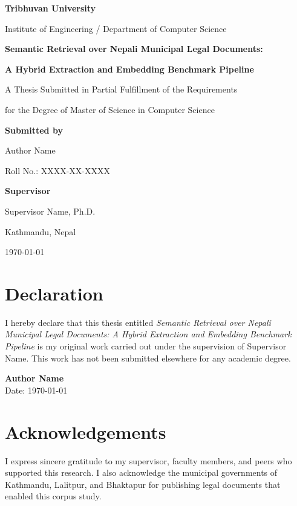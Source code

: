 \begin{titlepage}
  \centering
  \vspace*{1.5cm}
  {\LARGE\bfseries Tribhuvan University\par}
  \vspace{0.4cm}
  {\large Institute of Engineering / Department of Computer Science\par}
  \vspace{2cm}
  {\huge\bfseries Semantic Retrieval over Nepali Municipal Legal Documents:\par}
  \vspace{0.5cm}
  {\LARGE\bfseries A Hybrid Extraction and Embedding Benchmark Pipeline\par}
  \vspace{2cm}
  {\Large A Thesis Submitted in Partial Fulfillment of the Requirements\par}
  {\Large for the Degree of Master of Science in Computer Science\par}
  \vspace{2cm}
  {\large\textbf{Submitted by}\par}
  {\Large Author Name\par}
  \vspace{0.5cm}
  {\large Roll No.: XXXX-XX-XXXX\par}
  \vspace{2cm}
  {\large\textbf{Supervisor}\par}
  {\Large Supervisor Name, Ph.D.\par}
  \vfill
  {\large Kathmandu, Nepal\par}
  {\large \today\par}
\end{titlepage}

\chapter*{Declaration}
I hereby declare that this thesis entitled \emph{Semantic Retrieval over Nepali Municipal Legal Documents: A Hybrid Extraction and Embedding Benchmark Pipeline} is my original work carried out under the supervision of Supervisor Name. This work has not been submitted elsewhere for any academic degree.

\vspace{1.5cm}
\noindent\textbf{Author Name}\\
Date: \today

\chapter*{Acknowledgements}
I express sincere gratitude to my supervisor, faculty members, and peers who supported this research. I also acknowledge the municipal governments of Kathmandu, Lalitpur, and Bhaktapur for publishing legal documents that enabled this corpus study.

